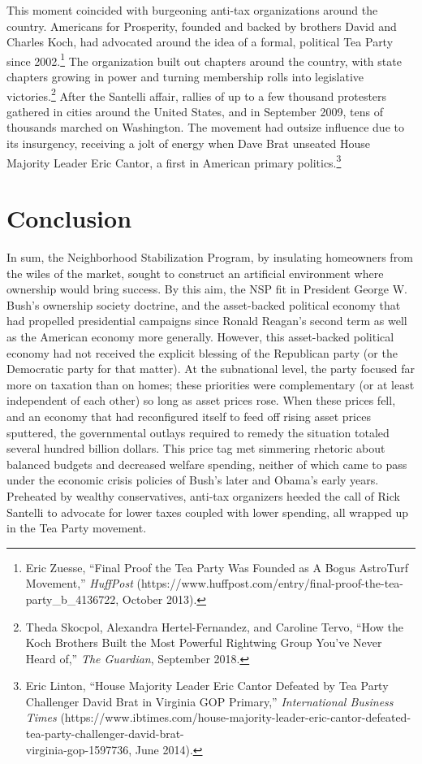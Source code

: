 \documentclass[12pt,oneside]{psthesis}
\begin{document}
This moment coincided with burgeoning anti-tax organizations around the country.
Americans for Prosperity, founded and backed by brothers David and Charles Koch, had advocated around the idea of a formal, political Tea Party since 2002.\footnote{Eric Zuesse, ``Final Proof the Tea Party Was Founded as A Bogus AstroTurf Movement,'' \emph{HuffPost} (https://www.huffpost.com/entry/final-proof-the-tea-party\_b\_4136722, October 2013).}
The organization built out chapters around the country, with state chapters growing in power and turning membership rolls into legislative victories.\footnote{Theda Skocpol, Alexandra Hertel-Fernandez, and Caroline Tervo, ``How the Koch Brothers Built the Most Powerful Rightwing Group You've Never Heard of,'' \emph{The Guardian}, September 2018.}
After the Santelli affair, rallies of up to a few thousand protesters gathered in cities around the United States, and in September 2009, tens of thousands marched on Washington.
The movement had outsize influence due to its insurgency, receiving a jolt of energy when Dave Brat unseated House Majority Leader Eric Cantor, a first in American primary politics.\footnote{Eric Linton, ``House Majority Leader Eric Cantor Defeated by Tea Party Challenger David Brat in Virginia GOP Primary,'' \emph{International Business Times} (https://www.ibtimes.com/house-majority-leader-eric-cantor-defeated-tea-party-challenger-david-brat-\\virginia-gop-1597736, June 2014).}

\hypertarget{conclusion}{%
\section{Conclusion}\label{conclusion}}

In sum, the Neighborhood Stabilization Program, by insulating homeowners from the wiles of the market, sought to construct an artificial environment where ownership would bring success.
By this aim, the NSP fit in President George W. Bush's ownership society doctrine, and the asset-backed political economy that had propelled presidential campaigns since Ronald Reagan's second term as well as the American economy more generally.
However, this asset-backed political economy had not received the explicit blessing of the Republican party (or the Democratic party for that matter).
At the subnational level, the party focused far more on taxation than on homes; these priorities were complementary (or at least independent of each other) so long as asset prices rose.
When these prices fell, and an economy that had reconfigured itself to feed off rising asset prices sputtered, the governmental outlays required to remedy the situation totaled several hundred billion dollars.
This price tag met simmering rhetoric about balanced budgets and decreased welfare spending, neither of which came to pass under the economic crisis policies of Bush's later and Obama's early years.
Preheated by wealthy conservatives, anti-tax organizers heeded the call of Rick Santelli to advocate for lower taxes coupled with lower spending, all wrapped up in the Tea Party movement.
\end{document}
